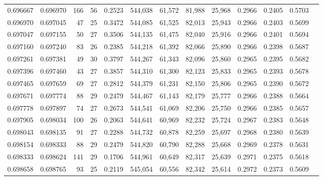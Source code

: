 \begin{tabular}{rrrrrrrrrrrrr}
0.696667 & 0.696970 &    166 &    56 &                                     0.2523 & 544,038 &  61,572 &  81,988 &  25,968 & 0.2966 & 0.2405 & 0.5703 \\
0.696970 & 0.697045 &     47 &    25 &                                     0.3472 & 544,085 &  61,525 &  82,013 &  25,943 & 0.2966 & 0.2403 & 0.5699 \\
0.697047 & 0.697155 &     50 &    27 &                                     0.3506 & 544,135 &  61,475 &  82,040 &  25,916 & 0.2966 & 0.2401 & 0.5694 \\
0.697160 & 0.697240 &     83 &    26 &                                     0.2385 & 544,218 &  61,392 &  82,066 &  25,890 & 0.2966 & 0.2398 & 0.5687 \\
0.697261 & 0.697381 &     49 &    30 &                                     0.3797 & 544,267 &  61,343 &  82,096 &  25,860 & 0.2965 & 0.2395 & 0.5682 \\
0.697396 & 0.697460 &     43 &    27 &                                     0.3857 & 544,310 &  61,300 &  82,123 &  25,833 & 0.2965 & 0.2393 & 0.5678 \\
0.697465 & 0.697659 &     69 &    27 &                                     0.2812 & 544,379 &  61,231 &  82,150 &  25,806 & 0.2965 & 0.2390 & 0.5672 \\
0.697671 & 0.697774 &     88 &    29 &                                     0.2479 & 544,467 &  61,143 &  82,179 &  25,777 & 0.2966 & 0.2388 & 0.5664 \\
0.697778 & 0.697897 &     74 &    27 &                                     0.2673 & 544,541 &  61,069 &  82,206 &  25,750 & 0.2966 & 0.2385 & 0.5657 \\
0.697905 & 0.698034 &    100 &    26 &                                     0.2063 & 544,641 &  60,969 &  82,232 &  25,724 & 0.2967 & 0.2383 & 0.5648 \\
0.698043 & 0.698135 &     91 &    27 &                                     0.2288 & 544,732 &  60,878 &  82,259 &  25,697 & 0.2968 & 0.2380 & 0.5639 \\
0.698154 & 0.698333 &     88 &    29 &                                     0.2479 & 544,820 &  60,790 &  82,288 &  25,668 & 0.2969 & 0.2378 & 0.5631 \\
0.698333 & 0.698624 &    141 &    29 &                                     0.1706 & 544,961 &  60,649 &  82,317 &  25,639 & 0.2971 & 0.2375 & 0.5618 \\
0.698658 & 0.698765 &     93 &    25 &                                     0.2119 & 545,054 &  60,556 &  82,342 &  25,614 & 0.2972 & 0.2373 & 0.5609 \\

\end{tabular}

